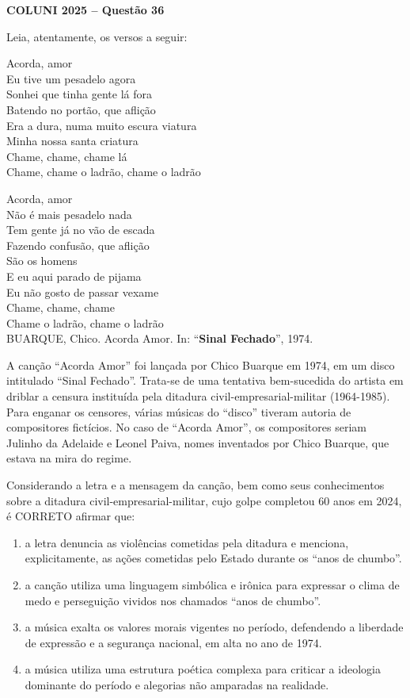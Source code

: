 \textbf{COLUNI 2025 -- Questão 36}\par\medskip Leia, atentamente, os versos a seguir:

\noindent\begin{minipage}[t]{0.49\linewidth}
Acorda, amor\\
Eu tive um pesadelo agora\\
Sonhei que tinha gente lá fora\\
Batendo no portão, que aflição\\
Era a dura, numa muito escura viatura\\
Minha nossa santa criatura\\
Chame, chame, chame lá\\
Chame, chame o ladrão, chame o ladrão
\end{minipage}\hfill\begin{minipage}[t]{0.49\linewidth}
Acorda, amor\\
Não é mais pesadelo nada\\
Tem gente já no vão de escada\\
Fazendo confusão, que aflição\\
São os homens\\
E eu aqui parado de pijama\\
Eu não gosto de passar vexame\\
Chame, chame, chame\\
Chame o ladrão, chame o ladrão\\
\hfill BUARQUE, Chico. Acorda Amor. In: “\textbf{Sinal Fechado}”, 1974.
\end{minipage}

\par

A canção “Acorda Amor” foi lançada por Chico Buarque em 1974, em um disco intitulado “Sinal Fechado”. Trata-se de uma tentativa bem-sucedida do artista em driblar a censura instituída pela ditadura civil-empresarial-militar (1964-1985). Para enganar os censores, várias músicas do “disco” tiveram autoria de compositores fictícios. No caso de “Acorda Amor”, os compositores seriam Julinho da Adelaide e Leonel Paiva, nomes inventados por Chico Buarque, que estava na mira do regime.

Considerando a letra e a mensagem da canção, bem como seus conhecimentos sobre a ditadura civil-empresarial-militar, cujo golpe completou 60 anos em 2024, é CORRETO afirmar que:
\begin{enumerate}
\item a letra denuncia as violências cometidas pela ditadura e menciona, explicitamente, as ações cometidas pelo Estado durante os “anos de chumbo”.
\item a canção utiliza uma linguagem simbólica e irônica para expressar o clima de medo e perseguição vividos nos chamados “anos de chumbo”.
\item a música exalta os valores morais vigentes no período, defendendo a liberdade de expressão e a segurança nacional, em alta no ano de 1974.
\item a música utiliza uma estrutura poética complexa para criticar a ideologia dominante do período e alegorias não amparadas na realidade.
\end{enumerate}
